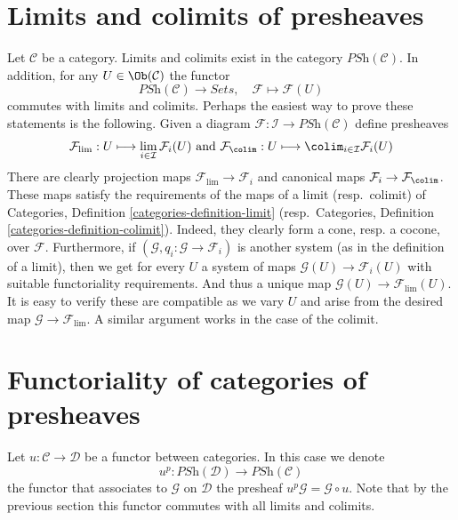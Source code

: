 \section{Limits and colimits of presheaves}
\label{section-limits-colimits-PSh}

\noindent
Let $\mathcal{C}$ be a category.
Limits and colimits exist in the category
$\textit{PSh}(\mathcal{C})$. In addition, for any
$U \in \Ob(\mathcal{C})$ the functor
$$
\textit{PSh}(\mathcal{C})
\longrightarrow
\textit{Sets}, \quad
\mathcal{F}
\longmapsto
\mathcal{F}(U)
$$
commutes with limits and colimits. Perhaps the easiest way to prove
these statements is the following. Given a diagram
$
\mathcal{F} :
\mathcal{I}
\to
\textit{PSh}(\mathcal{C})
$
define presheaves
$$
\mathcal{F}_{\lim} :
U
\longmapsto
\lim_{i \in \mathcal{I}} \mathcal{F}_i(U)
\text{  and  }
\mathcal{F}_{\colim} :
U
\longmapsto
\colim_{i \in \mathcal{I}} \mathcal{F}_i(U)
$$
There are clearly projection maps $\mathcal{F}_{\lim} \to \mathcal{F}_i$
and canonical maps $\mathcal{F}_i \to \mathcal{F}_{\colim}$. These
maps satisfy the requirements of the maps of a limit (resp.\ colimit)
of Categories, Definition \ref{categories-definition-limit}
(resp.\ Categories, Definition \ref{categories-definition-colimit}).
Indeed, they clearly form a cone, resp. a cocone, over $\mathcal{F}$.
Furthermore, if $(\mathcal{G}, q_i : \mathcal{G} \to \mathcal{F}_i)$
is another
system (as in the definition of a limit), then we get for every
$U$ a system of maps $\mathcal{G}(U) \to \mathcal{F}_i(U)$
with suitable functoriality requirements. And thus a unique
map $\mathcal{G}(U) \to \mathcal{F}_{\lim}(U)$. It is easy
to verify these are compatible  as we vary $U$ and arise from
the desired map $\mathcal{G} \to \mathcal{F}_{\lim}$.
A similar argument works in the case of the colimit.





















\section{Functoriality of categories of presheaves}
\label{section-functoriality-PSh}

\noindent
Let $u : \mathcal{C} \to \mathcal{D}$ be a functor between categories.
In this case we denote
$$
u^p :
\textit{PSh}(\mathcal{D})
\longrightarrow
\textit{PSh}(\mathcal{C})
$$
the functor that associates to $\mathcal{G}$ on $\mathcal{D}$ the presheaf
$u^p\mathcal{G} = \mathcal{G} \circ u$. Note that by the previous section
this functor commutes with all limits and colimits.

